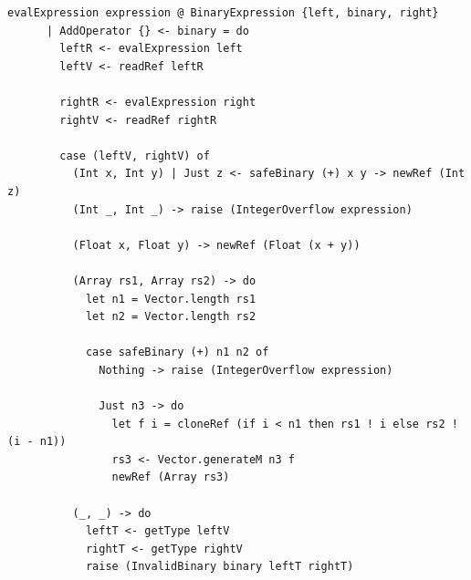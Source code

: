 \documentclass[UdineBachThesis,american,11pt,draft]{PhdThesis}
\begin{document}
  \begin{lstlisting}[gobble=4,basicstyle=\ttfamily\small]
    evalExpression expression @ BinaryExpression {left, binary, right}
      | AddOperator {} <- binary = do
        leftR <- evalExpression left
        leftV <- readRef leftR

        rightR <- evalExpression right
        rightV <- readRef rightR

        case (leftV, rightV) of
          (Int x, Int y) | Just z <- safeBinary (+) x y -> newRef (Int z)
          (Int _, Int _) -> raise (IntegerOverflow expression)

          (Float x, Float y) -> newRef (Float (x + y))

          (Array rs1, Array rs2) -> do
            let n1 = Vector.length rs1
            let n2 = Vector.length rs2

            case safeBinary (+) n1 n2 of
              Nothing -> raise (IntegerOverflow expression)

              Just n3 -> do
                let f i = cloneRef (if i < n1 then rs1 ! i else rs2 ! (i - n1))
                rs3 <- Vector.generateM n3 f
                newRef (Array rs3)

          (_, _) -> do
            leftT <- getType leftV
            rightT <- getType rightV
            raise (InvalidBinary binary leftT rightT)
  \end{lstlisting}
\end{document}
